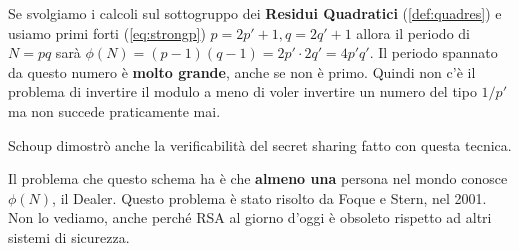 \begin{remark}Se svolgiamo i calcoli sul sottogruppo dei \textbf{Residui Quadratici} (\cref{def:quadres}) e usiamo primi forti (\cref{eq:strongp}) $p=2p'+1,q=2q'+1$ allora il periodo di $N=pq$ sarà $\phi(N)=(p-1)(q-1)=2p'\cdot2q'=4p'q'$. Il periodo spannato da questo numero è \textbf{molto grande}, anche se non è primo. Quindi non c'è il problema di invertire il modulo a meno di voler invertire un numero del tipo $1/p'$ ma non succede praticamente mai.
\end{remark}
\begin{note}
Schoup dimostrò anche la verificabilità del secret sharing fatto con questa tecnica.
\end{note}
\begin{note}
Il problema che questo schema ha è che \textbf{almeno una} persona nel mondo conosce $\phi(N)$, il Dealer. Questo problema è stato risolto da Foque e Stern, nel 2001. Non lo vediamo, anche perché RSA al giorno d'oggi è obsoleto rispetto ad altri sistemi di sicurezza.
\end{note}
